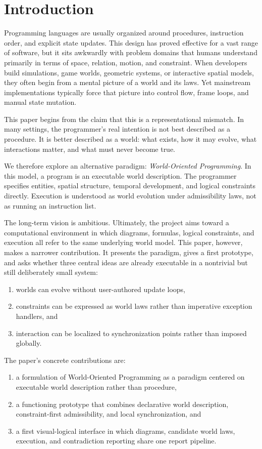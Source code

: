 \section{Introduction}

Programming languages are usually organized around procedures, instruction order, and explicit state updates.
This design has proved effective for a vast range of software, but it sits awkwardly with problem domains that humans understand primarily in terms of space, relation, motion, and constraint.
When developers build simulations, game worlds, geometric systems, or interactive spatial models, they often begin from a mental picture of a world and its laws.
Yet mainstream implementations typically force that picture into control flow, frame loops, and manual state mutation.

This paper begins from the claim that this is a representational mismatch.
In many settings, the programmer's real intention is not best described as a procedure.
It is better described as a world: what exists, how it may evolve, what interactions matter, and what must never become true.

We therefore explore an alternative paradigm: \emph{World-Oriented Programming}.
In this model, a program is an executable world description.
The programmer specifies entities, spatial structure, temporal development, and logical constraints directly.
Execution is understood as world evolution under admissibility laws, not as running an instruction list.

The long-term vision is ambitious.
Ultimately, the project aims toward a computational environment in which diagrams, formulas, logical constraints, and execution all refer to the same underlying world model.
This paper, however, makes a narrower contribution.
It presents the paradigm, gives a first prototype, and asks whether three central ideas are already executable in a nontrivial but still deliberately small system:
\begin{enumerate}
\item worlds can evolve without user-authored update loops,
\item constraints can be expressed as world laws rather than imperative exception handlers, and
\item interaction can be localized to synchronization points rather than imposed globally.
\end{enumerate}

The paper's concrete contributions are:
\begin{enumerate}
\item a formulation of World-Oriented Programming as a paradigm centered on executable world description rather than procedure,
\item a functioning prototype that combines declarative world description, constraint-first admissibility, and local synchronization, and
\item a first visual-logical interface in which diagrams, candidate world laws, execution, and contradiction reporting share one report pipeline.
\end{enumerate}

